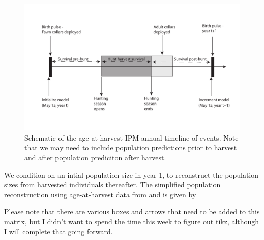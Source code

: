 \documentclass[12pt]{article}\usepackage[]{graphicx}\usepackage[]{color}
\begin{document}
\begin{figure}[H]
\begin{center}
\includegraphics[width=6 in]{IPM_timeline}
\caption{Schematic of the age-at-harvest IPM annual timeline of events. Note that we may need to include population predictions prior to harvest and after population prediciton after harvest.}\label{fig:timeline}
\end{center}
\end{figure}

We condition on an intial population size in year 1, to reconstruct the population sizes from harvested individuals thereafter. The simplified population reconstruction using age-at-harvest data from \citet{fieberg2010} and \citet{gast2013b} is given by
\begin{figure}[H]
\center
{}
\end{figure}
Please note that there are various boxes and arrows that need to be added to this matrix, but I didn't want to spend the time this week to figure out tikz, although I will complete that going forward.
\end{document}
